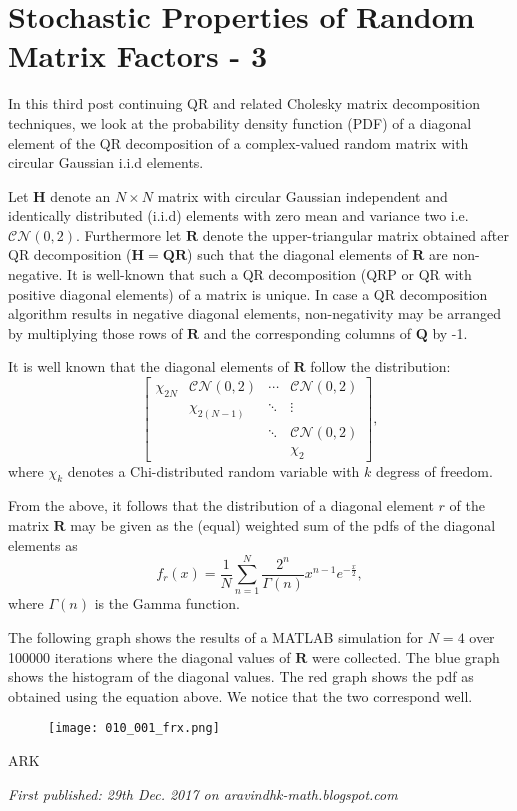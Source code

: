 \section{Stochastic Properties of Random Matrix Factors - 3}

In this third post continuing QR and related Cholesky matrix decomposition techniques, we look at the probability density function (PDF) of a diagonal element of the QR decomposition of a complex-valued random matrix with circular Gaussian i.i.d elements.

Let $\mathbf{H}$ denote an $N\times N$ matrix with circular Gaussian independent and identically distributed (i.i.d) elements with zero mean and variance two i.e. $\mathcal{CN}(0,2)$. Furthermore let $\mathbf{R}$ denote the upper-triangular matrix obtained after QR decomposition ($\mathbf{H} = \mathbf{Q}\mathbf{R}$) such that the diagonal elements of $\mathbf{R}$ are non-negative. It is well-known that such a QR decomposition (QRP or QR with positive diagonal elements) of a matrix is unique. In case a QR decomposition algorithm results in negative diagonal elements, non-negativity may be arranged by multiplying those rows of $\mathbf{R}$ and the corresponding columns of $\mathbf{Q}$ by -1.

It is well known that the diagonal elements of $\mathbf{R}$ follow the distribution:
$$
\begin{bmatrix}
	\chi_{2N} & \mathcal{CN}(0,2) & \cdots &  \mathcal{CN}(0,2)\\
	& \chi_{2(N-1)} & \ddots & \vdots\\
	& & \ddots & \mathcal{CN}(0,2)\\
	& & & \chi_{2}
\end{bmatrix},
$$
where $\chi_{k}$ denotes a Chi-distributed random variable with $k$ degress of freedom.

From the above, it follows that the distribution of a diagonal element $r$ of the matrix $\mathbf{R}$ may be given as the (equal) weighted sum of the pdfs of the diagonal elements as
$$
f_r(x) = \frac{1}{N} \sum_{n=1}^{N} \frac{2^{n}}{\Gamma(n)} x^{n-1} e^{-\frac{x}{2}},
$$
where $\Gamma(n)$ is the Gamma function.

The following graph shows the results of a MATLAB simulation for $N=4$ over 100000 iterations where the diagonal values of $\mathbf{R}$ were collected. The blue graph shows the histogram of the diagonal values. The red graph shows the pdf as obtained using the equation above. We notice that the two correspond well.


\begin{figure}[H]
	\centering
	\texttt{[image: 010\_001\_frx.png]}
\end{figure}

ARK

\emph{First published: 29th Dec. 2017 on aravindhk-math.blogspot.com}
